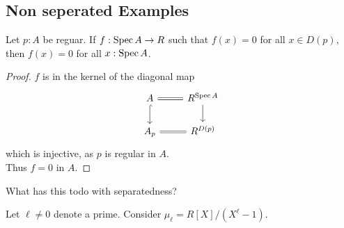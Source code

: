 \subsection{Non seperated Examples}
\begin{lemma}{\label{lemma:AlmostEverywhere}}
	Let $p : A$ be reguar. If $f : \operatorname{Spec} A \to R$ such that $f(x) = 0$ for all $x \in D(p)$, then $f(x) = 0$ for all $x : \operatorname{Spec} A$.
\end{lemma}
\begin{proof}
	$f$ is in the kernel of the diagonal map
\[\begin{tikzcd}
	{A} & {R^{\Spec A}} \\
	{A_p} & {R^{D(p)}}
	\arrow[hook, from=1-1, to=2-1]
	\arrow[Rightarrow, no head, from=1-2, to=1-1]
	\arrow[from=1-2, to=2-2]
	\arrow[Rightarrow, no head, from=2-2, to=2-1]
\end{tikzcd}\]
	which is injective, as $p$ is regular in $A$. \\
	Thus $f = 0$ in $A$.
\end{proof}
\begin{question}
	What has this todo with separatedness?
\end{question}
Let $\ell \neq 0$ denote a prime. Consider $\mu_\ell = R[X] / (X^\ell - 1)$.

